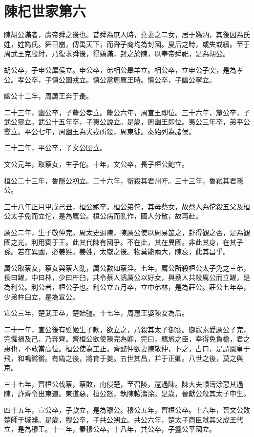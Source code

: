 \chapter{陳杞世家第六}

陳胡公滿者，虞帝舜之後也。昔舜為庶人時，堯妻之二女，居于媯汭，其後因為氏姓，姓媯氏。舜已崩，傳禹天下，而舜子商均為封國。夏后之時，或失或續。至于周武王克殷紂，乃復求舜後，得媯滿，封之於陳，以奉帝舜祀，是為胡公。

胡公卒，子申公犀侯立。申公卒，弟相公皋羊立。相公卒，立申公子突，是為孝公。孝公卒，子慎公圉戎立。慎公當周厲王時。慎公卒，子幽公寧立。

幽公十二年，周厲王奔于彘。

二十三年，幽公卒，子釐公孝立。釐公六年，周宣王即位。三十六年，釐公卒，子武公靈立。武公十五年卒，子夷公說立。是歲，周幽王即位。夷公三年卒，弟平公燮立。平公七年，周幽王為犬戎所殺，周東徙。秦始列為諸侯。

二十三年，平公卒，子文公圉立。

文公元年，取蔡女，生子佗。十年，文公卒，長子桓公鮑立。

桓公二十三年，魯隱公初立。二十六年，衛殺其君州吁。三十三年，魯弒其君隱公。

三十八年正月甲戌己丑，桓公鮑卒。桓公弟佗，其母蔡女，故蔡人為佗殺五父及桓公太子免而立佗，是為厲公。桓公病而亂作，國人分散，故再赴。

厲公二年，生子敬仲完。周太史過陳，陳厲公使以周易筮之，卦得觀之否，是為觀國之光，利用賓于王。此其代陳有國乎。不在此，其在異國。非此其身，在其子孫。若在異國，必姜姓。姜姓，太嶽之後。物莫能兩大，陳衰，此其昌乎。

厲公取蔡女，蔡女與蔡人亂，厲公數如蔡淫。七年，厲公所殺桓公太子免之三弟，長曰躍，中曰林，少曰杵臼，共令蔡人誘厲公以好女，與蔡人共殺厲公而立躍，是為利公。利公者，桓公子也。利公立五月卒，立中弟林，是為莊公。莊公七年卒，少弟杵臼立，是為宣公。

宣公三年，楚武王卒，楚始彊。十七年，周惠王娶陳女為后。

二十一年，宣公後有嬖姬生子款，欲立之，乃殺其太子御寇。御寇素愛厲公子完，完懼禍及己，乃奔齊。齊桓公欲使陳完為卿，完曰，羈旅之臣，幸得免負檐，君之惠也，不敢當高位。桓公使為工正。齊懿仲欲妻陳敬仲，卜之，占曰，是謂鳳皇于飛，和鳴鏘鏘。有媯之後，將育于姜。五世其昌，并于正卿。八世之後，莫之與京。

三十七年，齊桓公伐蔡，蔡敗，南侵楚，至召陵，還過陳。陳大夫轅濤涂惡其過陳，詐齊令出東道。東道惡，桓公怒，執陳轅濤涂。是歲，晉獻公殺其太子申生。

四十五年，宣公卒，子款立，是為穆公。穆公五年，齊桓公卒。十六年，晉文公敗楚師于城濮。是歲，穆公卒，子共公朔立。共公六年，楚太子商臣弒其父成王代立，是為穆王。十一年，秦穆公卒。十八年，共公卒，子靈公平國立。

